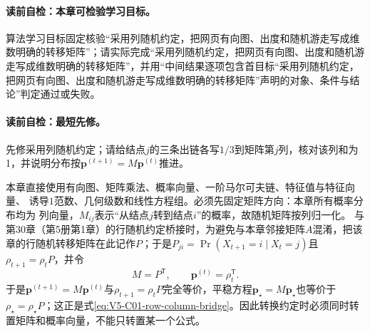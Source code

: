 \label{struct:V5-C07-CH01}
\paragraph{读前自检：本章可检验学习目标。}\PageRank{} 算法学习目标固定核验“采用列随机约定，把网页有向图、出度和随机游走写成维数明确的转移矩阵”；请实际完成“采用列随机约定，把网页有向图、出度和随机游走写成维数明确的转移矩阵”，并用“中间结果逐项包含首目标“采用列随机约定，把网页有向图、出度和随机游走写成维数明确的转移矩阵”声明的对象、条件与结论”判定通过或失败。\par


\label{struct:V5-C07-CH02}
\paragraph{读前自检：最短先修。}\PageRank{}先修采用列随机约定；请给结点$j$的三条出链各写$1/3$到矩阵第$j$列，核对该列和为1，并说明分布按$\boldsymbol p^{(t+1)}=M\boldsymbol p^{(t)}$推进。\par

\begin{prerequisitebox}
本章直接使用有向图、矩阵乘法、概率向量、一阶马尔可夫链、特征值与特征向量、
诱导$1$范数、几何级数和线性方程组。必须先固定矩阵方向：本章所有概率分布均为
列向量，$M_{ij}$表示“从结点$j$转到结点$i$”的概率，故随机矩阵按列归一化。
与第30章（第5册第1章）的行随机约定桥接时，为避免与本章邻接矩阵$A$混淆，把该章的行随机转移矩阵在此记作$P$；于是$P_{ji}=\Pr(X_{t+1}=i\mid X_t=j)$且$\rho_{t+1}=\rho_tP$，并令
\[
M=P^{\mathsf T},\qquad \boldsymbol p^{(t)}=\rho_t^{\mathsf T}.
\]
于是$\boldsymbol p^{(t+1)}=M\boldsymbol p^{(t)}$与$\rho_{t+1}=\rho_tP$完全等价，平稳方程$\boldsymbol p_\star=M\boldsymbol p_\star$也等价于$\rho_\star=\rho_\star P$；这正是式\eqref{eq:V5-C01-row-column-bridge}。因此转换约定时必须同时转置矩阵和概率向量，不能只转置某一个公式。
\end{prerequisitebox}

